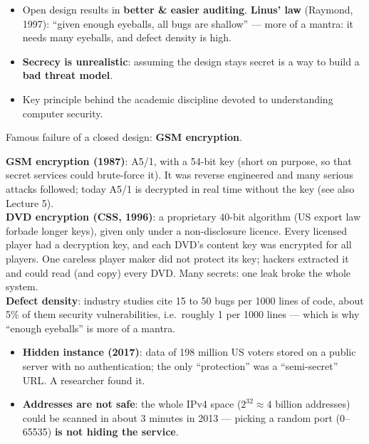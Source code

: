 \begin{propbox}[title=Why open design?]
\begin{itemize}
  \item Open design results in \textbf{better \& easier auditing}. \textbf{Linus' law}
        (Raymond, 1997): ``given enough eyeballs, all bugs are shallow'' --- more of a
        mantra: it needs many eyeballs, and defect density is high.
  \item \textbf{Secrecy is unrealistic}: assuming the design stays secret is a way to
        build a \textbf{bad threat model}.
  \item Key principle behind the academic discipline devoted to understanding computer
        security.
\end{itemize}
Famous failure of a closed design: \textbf{GSM encryption}.
\end{propbox}

\begin{exbox}[title={Closed designs that failed: GSM and DVD}]
\textbf{GSM encryption (1987)}: A5/1, with a 54-bit key (short on purpose, so that secret
services could brute-force it). It was reverse engineered and many serious attacks followed;
today A5/1 is decrypted in real time without the key (see also Lecture 5). \\
\textbf{DVD encryption (CSS, 1996)}: a proprietary 40-bit algorithm (US export law forbade longer
keys), given only under a non-disclosure licence. Every licensed player had a decryption key, and
each DVD's content key was encrypted for all players. One careless player maker did not protect
its key; hackers extracted it and could read (and copy) every DVD. Many secrets: one leak broke
the whole system. \\
\textbf{Defect density}: industry studies cite 15 to 50 bugs per 1000 lines of code, about 5\% of
them security vulnerabilities, i.e.\ roughly 1 per 1000 lines --- which is why ``enough
eyeballs'' is more of a mantra.
\end{exbox}

\begin{exbox}[title=Security through obscurity does not work]
\begin{itemize}
  \item \textbf{Hidden instance (2017)}: data of 198 million US voters stored on a
        public server with no authentication; the only ``protection'' was a
        ``semi-secret'' URL. A researcher found it.
  \item \textbf{Addresses are not safe}: the whole IPv4 space ($2^{32}\approx 4$
        billion addresses) could be scanned in about 3 minutes in 2013 --- picking a
        random port (0--65535) \textbf{is not hiding the service}.
\end{itemize}
\end{exbox}

